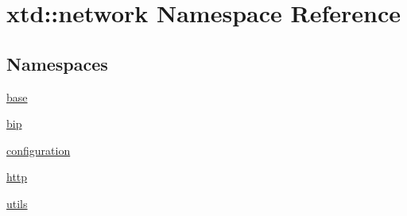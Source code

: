 \hypertarget{namespacextd_1_1network}{\section{xtd\-:\-:network Namespace Reference}
\label{namespacextd_1_1network}
}
\subsection*{Namespaces}
\begin{DoxyCompactItemize}
\item 
\hyperlink{namespacextd_1_1network_1_1base}{base}
\item 
\hyperlink{namespacextd_1_1network_1_1bip}{bip}
\item 
\hyperlink{namespacextd_1_1network_1_1configuration}{configuration}
\item 
\hyperlink{namespacextd_1_1network_1_1http}{http}
\item 
\hyperlink{namespacextd_1_1network_1_1utils}{utils}
\end{DoxyCompactItemize}
